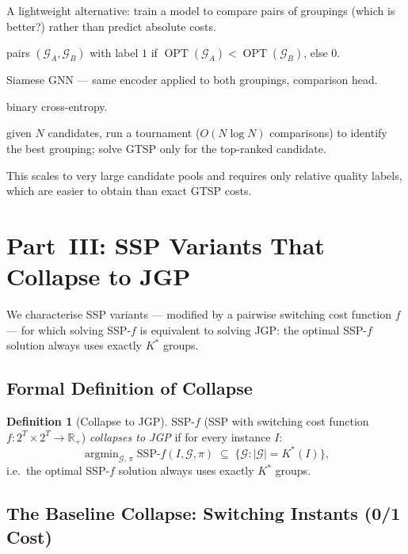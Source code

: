 \documentclass[11pt,a4paper]{article}
\theoremstyle{plain}
\theoremstyle{definition}
\newtheorem{definition}[theorem]{Definition}
\DeclareMathOperator{\OPT}{OPT}
\DeclareMathOperator*{\argmin}{argmin}
\newcommand{\calG}{\mathcal{G}}     %
\newcommand{\Kstar}{K^{*}}          %
\begin{document}
A lightweight alternative: train a model to compare pairs of groupings (which is better?)
rather than predict absolute costs.

\begin{description}[leftmargin=*]
  \item[Training data:] pairs $(\calG_A, \calG_B)$ with label $1$ if
    $\OPT(\calG_A) < \OPT(\calG_B)$, else $0$.
  \item[Model:] Siamese GNN --- same encoder applied to both groupings, comparison head.
  \item[Loss:] binary cross-entropy.
  \item[Inference:] given $N$ candidates, run a tournament ($O(N \log N)$ comparisons)
    to identify the best grouping; solve GTSP only for the top-ranked candidate.
\end{description}

This scales to very large candidate pools and requires only relative quality labels,
which are easier to obtain than exact GTSP costs.

\section{Part~III: SSP Variants That Collapse to JGP}
\label{sec:partIII}

We characterise SSP variants --- modified by a pairwise switching cost function $f$ ---
for which solving SSP-$f$ is equivalent to solving JGP: the optimal SSP-$f$ solution
always uses exactly $\Kstar$ groups.

\subsection{Formal Definition of Collapse}
\label{sec:collapse-def}

\begin{definition}[Collapse to JGP]
\label{def:collapse}
SSP-$f$ (SSP with switching cost function $f: 2^T \times 2^T \to \mathbb{R}_+$)
\emph{collapses to JGP} if for every instance $I$:
\[
  \argmin_{\calG,\, \pi} \mathrm{SSP}\text{-}f(I, \calG, \pi)
  \;\subseteq\;
  \bigl\{\calG : |\calG| = \Kstar(I)\bigr\},
\]
i.e.\ the optimal SSP-$f$ solution always uses exactly $\Kstar$ groups.
\end{definition}

\subsection{The Baseline Collapse: Switching Instants (0/1 Cost)}
\label{sec:TSIP}
\end{document}
